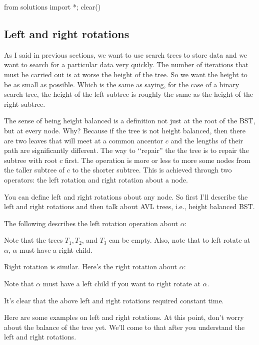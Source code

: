 \begin{python0}
from solutions import *; clear()
\end{python0}

\subsection{Left and right rotations}

As I said in previous sections, we want to use search trees to store data
and we want to search for a particular data very quickly.
The number of iterations that must be carried out is at
worse the height of the tree.
So we want the height to be as small as possible.
Which is the same as saying, for the case of a binary search tree,
the height of the left subtree
is roughly the same as the height of the right subtree.

The sense of being height balanced is a definition not just at the root
of the BST, but at every node.
Why?
Because if the tree is not height balanced, then there are two leaves
that will meet at a common ancentor $c$ and the lengths of their
path are significantly different.
The way to \lq\lq repair'' the the tree is to repair the subtree with
root $c$ first.
The operation is more or less to more some nodes from the taller
subtree of $c$ to the shorter subtree.
This is achieved through two operators:
the left rotation and right rotation about a node.

You can define left and right rotations about any node.
So first I'll describe the left and right rotations and then talk about
AVL trees, i.e., height balanced BST.

The following describes the left rotation operation about 
$\alpha$:




Note that the trees $T_1, T_2$, and $T_3$ can be empty.
Also, note that to left rotate at $\alpha$, $\alpha$ must have a right child.


Right rotation is similar.
Here's the right rotation about $\alpha$:





Note that $\alpha$ must have a left child if you want to
right rotate at $\alpha$.

It's clear that the above
left and right rotations required constant time.

Here are some examples on left and right rotations.
At this point, don't worry about the balance of the tree yet.
We'll come to that after you understand the left and right rotations.


